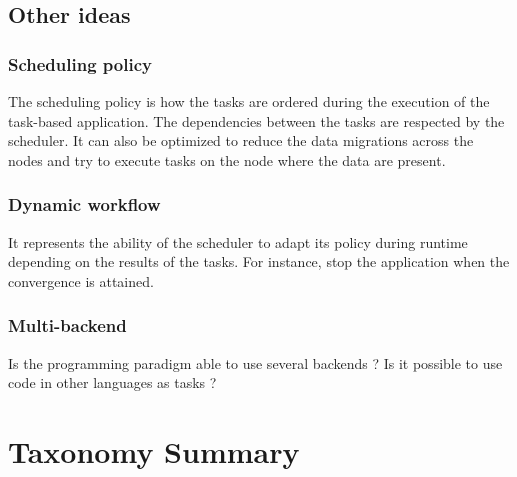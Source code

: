 %	


\subsection{Other ideas}
\subsubsection{Scheduling policy}
The scheduling policy is how the tasks are ordered during the execution of the task-based application.
The dependencies between the tasks are respected by the scheduler.
It can also be optimized to reduce the data migrations across the nodes and try to execute tasks on the node where the data are present.

\subsubsection{Dynamic workflow}
It represents the ability of the scheduler to adapt its policy during runtime depending on the results of the tasks.
For instance, stop the application when the convergence is attained.


\subsubsection{Multi-backend}
Is the programming paradigm able to use several backends ?
Is it possible to use code in other languages as tasks ?



\section{Taxonomy Summary}


